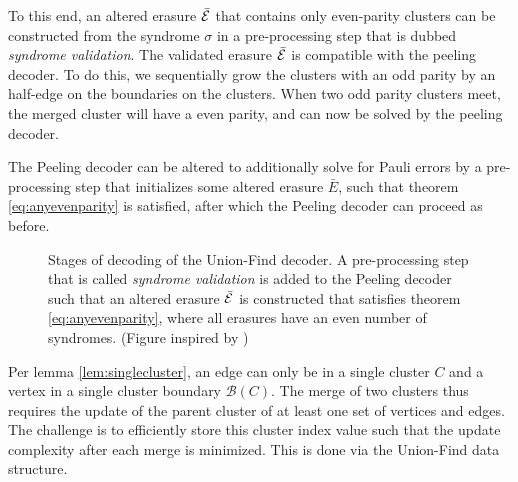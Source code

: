 To this end, an altered erasure $\bar{\mathcal{E}}$ that contains only even-parity clusters can be constructed from the syndrome $\sigma$ in a pre-processing step that is dubbed \emph{syndrome validation}. The validated erasure $\bar{\mathcal{E}}$ is compatible with the peeling decoder. To do this, we sequentially grow the clusters with an odd parity by an half-edge on the boundaries on the clusters. When two odd parity clusters meet, the merged cluster will have a even parity, and can now be solved by the peeling decoder. 
\begin{proposition}
  The Peeling decoder can be altered to additionally solve for Pauli errors by a pre-processing step that initializes some altered erasure $\bar{E}$, such that theorem \ref{eq:anyevenparity} is satisfied, after which the Peeling decoder can proceed as before. 
\end{proposition}
\begin{figure}[h]
  \centering
  \caption{Stages of decoding of the Union-Find decoder. A pre-processing step that is called \emph{syndrome validation} is added to the Peeling decoder such that an altered erasure $\bar{\mathcal{E}}$ is constructed that satisfies theorem \ref{eq:anyevenparity}, where all erasures have an even number of syndromes. (Figure inspired by \cite{delfosse2017almost})} 
  \label{fig:ufstages}
\end{figure}
Per lemma \ref{lem:singlecluster}, an edge can only be in a single cluster $C$ and a vertex in a single cluster boundary $\mathscr{B}(C)$. The merge of two clusters thus requires the update of the parent cluster of at least one set of vertices and edges. The challenge is to efficiently store this cluster index value such that the update complexity after each merge is minimized. This is done via the Union-Find data structure.

